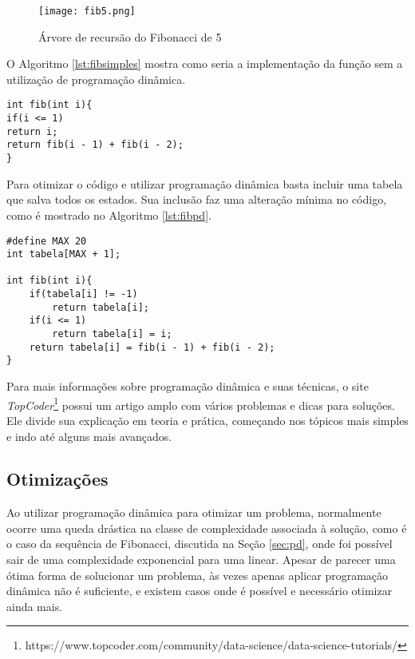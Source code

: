 \begin{figure}[H]
	\centering
	\caption[Árvore de recursão do Fibonacci de 5]{Árvore de recursão do Fibonacci de 5}
	\texttt{[image: fib5.png]} %
	\label{fig:fib5}
\end{figure}


O Algoritmo \ref{lst:fibsimples} mostra como seria a implementação da função sem a utilização de programação dinâmica.
\begin{lstlisting}[caption={Implementação Fibonacci sem programação dinâmica em C++},label={lst:fibsimples}]
int fib(int i){
if(i <= 1)
return i;
return fib(i - 1) + fib(i - 2);
}

\end{lstlisting}

Para otimizar o código e utilizar programação dinâmica basta incluir uma tabela que salva todos os estados. Sua inclusão faz uma alteração mínima no código, como é mostrado no Algoritmo \ref{lst:fibpd}.


\begin{lstlisting}[caption={Implementação Fibonacci com programação dinâmica em C++},label={lst:fibpd}]
#define MAX 20 
int tabela[MAX + 1]; 

int fib(int i){
	if(tabela[i] != -1) 
		return tabela[i];
	if(i <= 1)
		return tabela[i] = i;
	return tabela[i] = fib(i - 1) + fib(i - 2);
}
\end{lstlisting}

Para mais informações sobre programação dinâmica e suas técnicas, o site \textit{TopCoder}\footnote{https://www.topcoder.com/community/data-science/data-science-tutorials/} possui um artigo amplo com vários problemas e dicas para soluções. Ele divide sua explicação em teoria e prática, começando nos tópicos mais simples e indo até alguns mais avançados.

\subsection{Otimizações}

Ao utilizar programação dinâmica para otimizar um problema, normalmente ocorre uma queda drástica na classe de complexidade associada à solução, como é o caso da sequência de Fibonacci, discutida na Seção \ref{sec:pd}, onde foi possível sair de uma complexidade exponencial para uma linear. Apesar de parecer uma ótima forma de solucionar um problema, às vezes apenas aplicar programação dinâmica não é suficiente, e existem casos onde é possível e necessário otimizar ainda mais.

